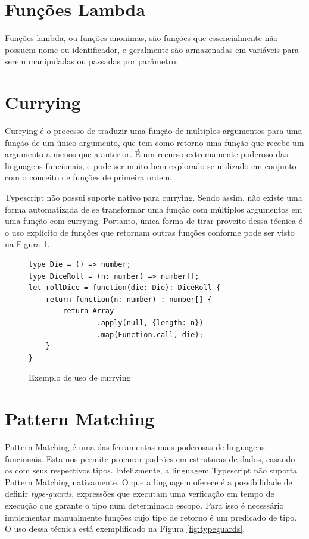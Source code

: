 \documentclass[rel_mlp]{iiufrgs}
\numberwithin{figure}{chapter}
\begin{document}
\section{Funções Lambda}

Funções lambda, ou funções anonimas, são funções que essencialmente não possuem nome ou identificador, e geralmente são armazenadas em variáveis para serem manipuladas ou passadas por parâmetro.


\section{Currying}

Currying é o processo de traduzir uma função de multiplos argumentos para uma função de um único argumento, que tem como retorno uma função que recebe um argumento a menos que a anterior. É um recurso extremamente poderoso das linguagens funcionais, e pode ser muito bem explorado se utilizado em conjunto com o conceito de funções de primeira ordem.

Typescript não possui suporte nativo para currying. Sendo assim, não existe uma forma automatizada de se transformar uma função com múltiplos argumentos em uma função com currying. Portanto, única forma de tirar proveito dessa técnica é o uso explícito de funções que retornam outras funções conforme pode ser visto na Figura \ref{fig:currying}.

\begin{figure}[h]
\begin{verbatim}
type Die = () => number;
type DiceRoll = (n: number) => number[];
let rollDice = function(die: Die): DiceRoll {
    return function(n: number) : number[] {
        return Array
        		.apply(null, {length: n})
        		.map(Function.call, die);
    }
}
\end{verbatim}
\caption{Exemplo de uso de currying}
\label{fig:currying}
\end{figure}

\section{Pattern Matching}

Pattern Matching é uma das ferramentas mais poderosas de linguagens funcionais. Esta nos permite procurar padrões em estruturas de dados, casando-os com seus respectivos tipos. Infelizmente, a linguagem Typescript não suporta Pattern Matching nativamente. O que a linguagem oferece é a possibilidade de definir \textit{type-guards}, expressões que executam uma verficação em tempo de execução que garante o tipo num determinado escopo. Para isso é necessário implementar manualmente funções cujo tipo de retorno é um predicado de tipo. O uso dessa técnica está exemplificado na Figura \ref{fig:typeguards}.
\end{document}
